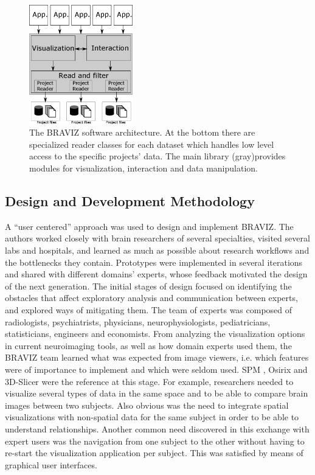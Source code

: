 \documentclass[twocolumn]{svjour3}
\begin{document}
\begin{figure}
\begin{center}
\includegraphics[width=0.4\textwidth]{figures/arquitecture.png}
\end{center}
 \caption{\label{fig_arch} The BRAVIZ software architecture. At the bottom there are specialized reader classes for each dataset which handles low level access to the specific projects' data. The main library (gray)provides modules for visualization, interaction and data manipulation. }
\end{figure}


\subsection{Design and Development Methodology}

A ``user centered'' approach \cite{wassink_applying_2009} was used to design and implement BRAVIZ. The authors worked closely with brain researchers of several specialties, visited several labs and hospitals, and learned as much as possible about research workflows and the bottlenecks they contain. Prototypes were implemented in several iterations and shared with different domains’ experts, whose feedback motivated the design of the next generation.
The initial stages of design focused on identifying the obstacles that affect exploratory analysis and communication between experts, and explored ways of mitigating them. The team of experts was composed of radiologists, psychiatrists, physicians, neurophysiologists, pediatricians, statisticians, engineers and economists.
From analyzing the visualization options in current neuroimaging tools, as well as how domain experts used them, the BRAVIZ team learned what was expected from image viewers, i.e. which features were of importance to implement and which were seldom used. SPM \cite{friston_statistical_2007}, Osirix \cite{rosset_osirix:_2004} and 3D-Slicer \cite{fedorov_3d_2012} were the reference at this stage. For example, researchers needed to visualize several types of data in the same space and to be able to compare brain images between two subjects. Also obvious was the need to integrate spatial visualizations with non-spatial data for the same subject in order to be able to understand relationships. Another common need discovered in this exchange with expert users was the navigation from one subject to the other without having to re-start the visualization application per subject. This was satisfied by means of graphical user interfaces.
\end{document}

